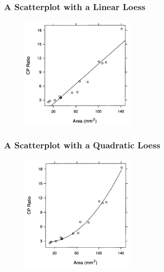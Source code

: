 \documentclass[aspectratio=1610]{beamer}
\begin{document}
\begin{frame}
	\frametitle{A Scatterplot with a Linear Loess}
	\begin{figure}
		\begin{center}
			\includegraphics[width=0.5\textwidth]{figures/scatterplot_lm.png}
		\end{center}
	\end{figure}
\end{frame}

\begin{frame}
	\frametitle{A Scatterplot with a Quadratic Loess}
	\begin{figure}
		\begin{center}
			\includegraphics[width=0.5\textwidth]{figures/scatterplot_qm.png}
		\end{center}
	\end{figure}
\end{frame}
\end{document}
